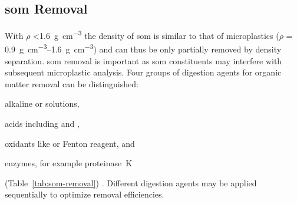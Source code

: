 \subsection{\Acs{som} Removal}
\label{sec:analytical-techniques:som-removal}

With $\rho$ \SI{<1.6}{\gram\per\cubic\centi\meter} \citep{CerliSeparation2012} the density of \ac{som} is similar to that of microplastics ($\rho$ = \SIrange{0.9}{1.6}{\gram\per\cubic\centi\meter}) \citep{EndersEvaluation2020} and can thus be only partially removed by density separation. \Ac{som} removal is important as
\ac{som} constituents may interfere with subsequent microplastic analysis. Four groups of digestion agents for organic matter removal can be distinguished:
\begin{enumerate*}
	\item alkaline 	or  solutions, 
	\item acids including  and ,
	\item oxidants like  or Fenton reagent, and
	\item enzymes, for example proteinase~K
\end{enumerate*}
(Table~\ref{tab:som-removal}) \citep{DehautMicroplastics2016}.
Different digestion agents may be applied sequentially to optimize removal efficiencies.

